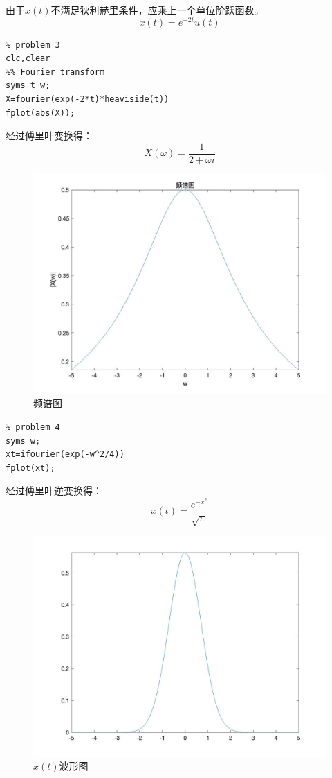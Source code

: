 \documentclass[a4paper,12pt]{ctexart}
\begin{document}
由于$x(t)$不满足狄利赫里条件，应乘上一个单位阶跃函数。
\begin{equation}
    x(t)=e^{-2t}u(t)
\end{equation}
\begin{lstlisting}
% problem 3
clc,clear
%% Fourier transform
syms t w;
X=fourier(exp(-2*t)*heaviside(t))
fplot(abs(X));
\end{lstlisting}
经过傅里叶变换得：
\begin{equation}
    X(\omega)=\frac{1}{2+\omega i}
\end{equation}
\begin{figure}[H]
    \centering
    \includegraphics[width=14cm]{3.jpg}
    \caption{频谱图}
\end{figure}


\begin{lstlisting}
% problem 4
syms w;
xt=ifourier(exp(-w^2/4))
fplot(xt);
\end{lstlisting}
经过傅里叶逆变换得：
\begin{equation}
    x(t)=\frac{e^{-x^2}}{\sqrt{\pi}}
\end{equation}
\begin{figure}[H]
    \centering
    \includegraphics[width=14cm]{4_1.jpg}
    \caption{$x(t)$波形图}
\end{figure}
\end{document}
